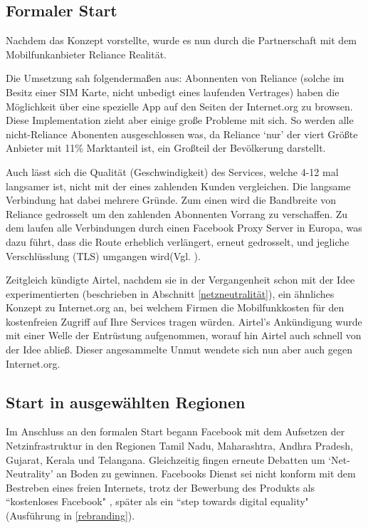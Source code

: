 \documentclass{article}
\begin{document}
\subsection{Formaler Start} \label{formal}

Nachdem \textcite{HumanRight} das Konzept vorstellte, wurde es nun durch die Partnerschaft mit dem Mobilfunkanbieter Reliance Realität.

Die Umsetzung sah folgendermaßen aus: Abonnenten von Reliance (solche im Besitz einer SIM Karte, nicht unbedigt eines laufenden Vertrages) haben die Möglichkeit über eine spezielle App auf den Seiten der Internet.org zu browsen.
Diese Implementation zieht aber einige große Probleme mit sich. So werden alle nicht-Reliance Abonenten ausgeschlossen was, da Reliance `nur' der viert Größte Anbieter mit 11\% Marktanteil\autocite{mobileSubscribers} ist, ein Großteil der Bevölkerung darstellt.

Auch lässt sich die Qualität (Geschwindigkeit) des Services, welche 4-12 mal langsamer ist, nicht mit der eines zahlenden Kunden vergleichen.
Die langsame Verbindung hat dabei mehrere Gründe. Zum einen wird die Bandbreite von Reliance gedrosselt um den zahlenden Abonnenten Vorrang zu verschaffen. Zu dem laufen alle Verbindungen durch einen Facebook Proxy Server in Europa, was dazu führt, dass die Route erheblich verlängert, erneut gedrosselt, und jegliche Verschlüsslung (TLS) umgangen wird(Vgl. \cite{walledGarden}).

\medskip

Zeitgleich kündigte Airtel, nachdem sie in der Vergangenheit schon mit der Idee experimentierten (beschrieben in Abschnitt \ref{netzneutralität}), ein ähnliches Konzept zu Internet.org an, bei welchem Firmen die Mobilfunkkosten für den kostenfreien Zugriff auf Ihre Services tragen würden.
Airtel's Ankündigung wurde mit einer Welle der Entrüstung aufgenommen, worauf hin Airtel auch schnell von der Idee abließ.
Dieser angesammelte Unmut wendete sich nun aber auch gegen Internet.org.

\subsection{Start in ausgewählten Regionen}

Im Anschluss an den formalen Start begann Facebook mit dem Aufsetzen der Netzinfrastruktur in den Regionen Tamil Nadu, Maharashtra, Andhra Pradesh, Gujarat, Kerala und Telangana.
Gleichzeitig fingen erneute Debatten um `Net-Neutrality' an Boden zu gewinnen.
Facebooks Dienst sei nicht konform mit dem Bestreben eines freien Internets, trotz der Bewerbung des Produkts als ``kostenloses Facebook" \parencite[3]{prasad2017}, später als ein ``step towards digital equality" (Ausführung in \ref{rebranding}).
\end{document}
